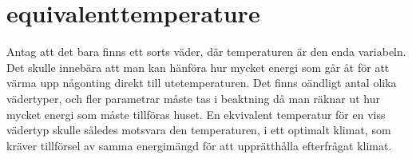 \section*{equivalenttemperature}
Antag att det bara finns ett sorts väder, där temperaturen är den enda variabeln. Det skulle innebära att man kan hänföra hur mycket energi som går åt för att värma upp någonting direkt till utetemperaturen. Det finns oändligt antal olika vädertyper, och fler parametrar måste tas i beaktning då man räknar ut hur mycket energi som måste tillföras huset. En ekvivalent temperatur för en viss vädertyp skulle således motsvara den temperaturen, i ett optimalt klimat, som kräver tillförsel av samma energimängd för att upprätthålla efterfrågat klimat.